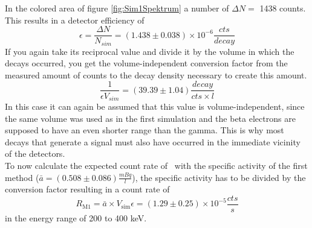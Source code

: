 \documentclass[encoding=utf8,british]{tumphthesis}
\begin{document}
In the colored area of figure \ref{fig:Sim1Spektrum} a number of $\Delta N =$ 1438 counts.
This results in a detector efficiency of 
\begin{equation*}
\epsilon = \frac{\Delta N}{N_{sim}} = (1.438 \pm 0.038) \times 10^{-6} \frac{\unit{cts}}{\unit{decay}}
\end{equation*}
If you again take its reciprocal value and divide it by the volume in which the decays occurred, you get the volume-independent conversion factor from the measured amount of counts to the decay density necessary to create this amount.
\begin{equation*}
\frac{1}{\epsilon V_{sim}} = (39.39 \pm 1.04) \frac{\unit{decay}}{\unit{cts \times l}}
\end{equation*}
In this case it can again be assumed that this value is volume-independent, since the same volume was used as in the first simulation and the beta electrons are supposed to have an even shorter range than the gamma.
This is why most decays that generate a signal must also have occurred in the immediate vicinity of the detectors.
\\

To now calculate the expected count rate of \Kr\ with the specific activity of the first method ($\bar{a} = (0.508\pm0.086)\frac{\unit{mBq}}{\unit{l}}$), the specific activity has to be divided by the conversion factor resulting in a count rate of 
\begin{equation*}
R_{\mathrm{M1}} = \bar{a} \times V_{\mathrm{sim}} \epsilon =  (1.29\pm0.25) \times 10^{-5} \frac{\unit{cts}}{\unit{s}}
\end{equation*}
in the energy range of 200 to 400 keV.
\end{document}
